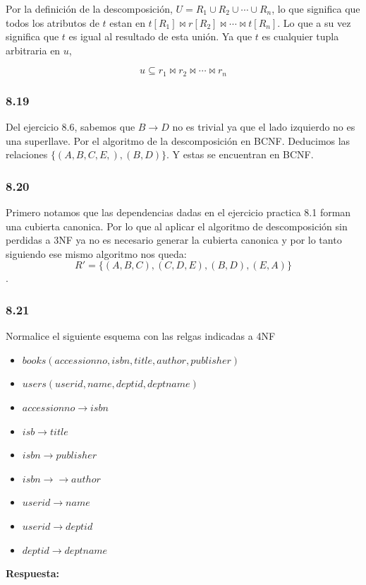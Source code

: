\documentclass[twoside]{article}
\begin{document}
Por la definici\'on de la descomposici\'on, $U = R_1 \cup R_2 \cup \cdots \cup R_n$, lo que significa que todos los atributos de $t$
estan en $t[R_1] \bowtie r[R_2] \bowtie \cdots \bowtie t[R_n]$. Lo que a su vez significa que $t$ es igual al resultado de esta uni\'on.
Ya que $t$ es cualquier tupla arbitraria en $u$,

$$u \subseteq r_1 \bowtie r_2 \bowtie \cdots \bowtie r_n$$

\subsubsection*{8.19}
Del ejercicio 8.6, sabemos que $B \rightarrow D$ no es trivial ya que el lado izquierdo no es una superllave.
Por el algoritmo de la descomposici\'on en BCNF. Deducimos las relaciones $\{(A, B, C, E,), (B, D)\}$. Y estas se encuentran
en BCNF.
\subsubsection*{8.20}
Primero notamos que las dependencias dadas en el ejercicio practica 8.1 forman una cubierta canonica. Por lo que
al aplicar el algoritmo de descomposici\'on sin perdidas a 3NF ya no es necesario generar la cubierta canonica y
por lo tanto siguiendo ese mismo algoritmo nos queda:
$$R' = \{(A, B, C), (C, D, E), (B, D), (E, A)\}$$.
\subsubsection*{8.21}
Normalice el siguiente esquema con las relgas indicadas a 4NF
\begin{itemize}
      \item $books(accessionno, isbn, title, author, publisher)$
      \item $users(userid, name, deptid, deptname)$
      \item $accessionno \rightarrow isbn$
      \item $isb \rightarrow title$
      \item $isbn \rightarrow publisher$
      \item $isbn \rightarrow \rightarrow author$
      \item $userid \rightarrow name$
      \item $userid \rightarrow deptid$
      \item $deptid \rightarrow deptname$
\end{itemize}

\textbf{Respuesta:}\\
\end{document}
